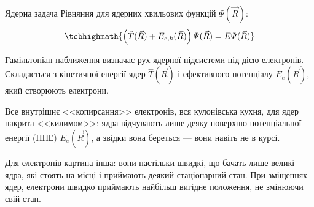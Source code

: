 \documentclass[]{beamer}
\begin{document}
\begin{frame}{Ядерна задача}{}
	Рівняння для ядерних хвильових функцій $\varPsi(\vec{R})$:
	\begin{equation*}\label{}
		\tcbhighmath{\left(\hat{T}(\vec{R}) + E_{e,k}(\vec{R}) \right)\varPsi(\vec{R})
			= E\varPsi(\vec{R})}
	\end{equation*}

	Гамільтоніан наближення 
	визначає рух ядерної підсистеми під дією електронів. Складається з кінетичної енергії ядер $\hat{T}(\vec{R})$ і ефективного потенціалу $E_{e}(\vec{R})$, який створюють електрони.


	\begin{block}{}\scriptsize\justifying
		Все внутрішнє <<копирсання>> електронів, вся кулонівська кухня, для ядер накрита <<килимом>>: ядра відчувають лише деяку поверхню потенціальної енергії (ППЕ) $E_{e}(\vec{R})$, а
		звідки вона береться --- вони навіть не в курсі.
	\end{block}

	\begin{block}{}\scriptsize\justifying
		Для електронів картина інша: вони настільки швидкі, що бачать лише великі ядра, які стоять на місці і приймають деякий стаціонарний стан. При зміщеннях ядер, електрони швидко приймають найбільш вигідне положення, не змінюючи свій стан.
	\end{block}
\end{frame}
\end{document}
